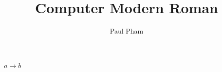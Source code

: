 \documentclass{article}
\title{Computer Modern Roman}
\author{Paul Pham}
\begin{document}
\maketitle

$a \rightarrow b$
\end{document}
